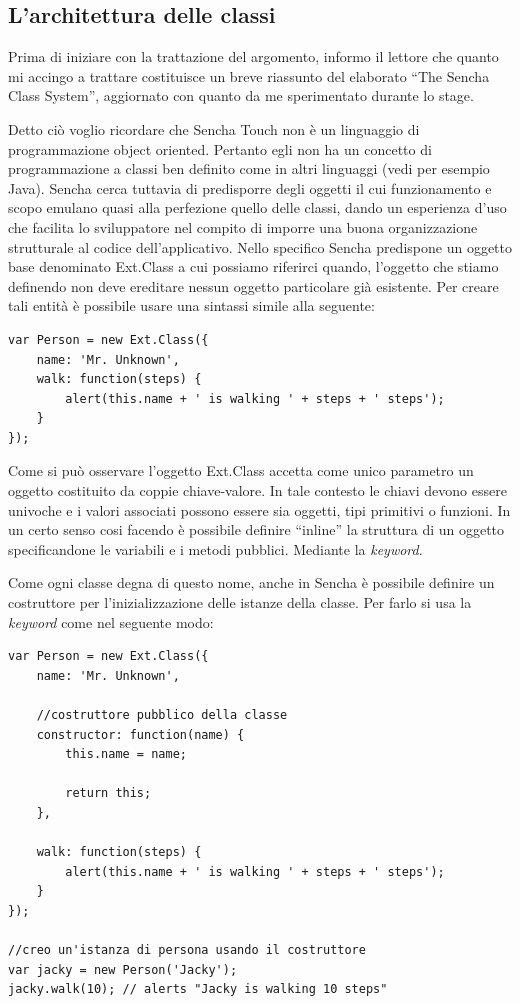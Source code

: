 \documentclass[10pt,a4paper,onecolumn]{article}
\begin{document}
\subsection{L'architettura delle classi}
Prima di iniziare con la trattazione del argomento, informo il lettore che quanto mi accingo a trattare costituisce un breve riassunto del elaborato ``The Sencha Class System'', aggiornato con quanto da me sperimentato durante lo stage. 

Detto ciò voglio ricordare che Sencha Touch non è un linguaggio di programmazione object oriented. Pertanto egli non ha un concetto di programmazione a classi ben definito come in altri linguaggi (vedi per esempio Java). Sencha cerca tuttavia di predisporre degli oggetti il cui funzionamento e scopo emulano quasi alla perfezione quello delle classi, dando un esperienza d'uso che facilita lo sviluppatore nel compito di imporre una buona organizzazione strutturale al codice dell'applicativo. Nello specifico Sencha predispone un oggetto base denominato Ext.Class a cui possiamo riferirci quando, l'oggetto che stiamo definendo non deve ereditare nessun oggetto particolare già esistente. Per creare tali entità è possibile usare una sintassi simile alla seguente:

\begin{lstlisting}
var Person = new Ext.Class({
    name: 'Mr. Unknown',
    walk: function(steps) {
        alert(this.name + ' is walking ' + steps + ' steps');
    }
});
\end{lstlisting}

Come si può osservare l'oggetto Ext.Class accetta come unico parametro un oggetto costituito da coppie chiave-valore. In tale contesto le chiavi devono essere univoche e i valori associati possono essere sia oggetti, tipi primitivi o funzioni. In un certo senso cosi facendo è possibile definire ``inline'' la struttura di un oggetto specificandone le variabili e i metodi pubblici. Mediante la \emph{keyword}.

Come ogni classe degna di questo nome, anche in Sencha è possibile definire un costruttore per l'inizializzazione delle istanze della classe. Per farlo si usa la \emph{keyword} come nel seguente modo:

\begin{lstlisting}
var Person = new Ext.Class({
    name: 'Mr. Unknown',
 
    //costruttore pubblico della classe
    constructor: function(name) {
        this.name = name;
 
        return this;
    },
 
    walk: function(steps) {
        alert(this.name + ' is walking ' + steps + ' steps');
    }
});

//creo un'istanza di persona usando il costruttore 
var jacky = new Person('Jacky');
jacky.walk(10); // alerts "Jacky is walking 10 steps"
\end{lstlisting}
\end{document}
